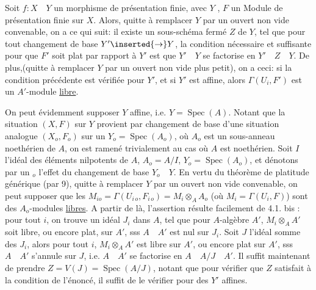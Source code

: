 

 Soit $f:X\quad Y$ un morphisme de présentation finie, avec $Y$ \inserted{$\neq\varnothing$}, $F$ un Module de présentation finie sur $X$. Alors, quitte à remplacer $Y$ par un ouvert non vide convenable, on a ce qui suit: il existe un sous-schéma fermé  $Z$ de $Y$,  tel que pour tout changement de base $Y'\inserted{\to}Y$, la condition nécessaire et suffisante pour que $F'$ soit plat par rapport à $Y'$ est que $Y'\quad Y$ se factorise  en $Y'\quad Z\quad Y$.
De plus,(quitte à remplacer $Y$ par un ouvert non vide plus petit), on a ceci: si la condition précédente est vérifiée pour $Y'$, et si $Y'$ est affine,  alors  $\Gamma(U_i,F')$ est un $A'$-module \uline{libre}.

On peut évidemment supposer $Y$ affine, i.e. $Y=\operatorname{Spec}(A)$. Notant que la situation $(X,F)$ sur $Y$ provient par changement de base d'une situation analogue $(X_o,F_o)$ sur un $Y_o=\operatorname{Spec}(A_o)$, où $A_o$ est un sous-anneau noethérien de $A$, on est ramené trivialement au cas où $A$ est noethérien. Soit $I$ l'idéal des éléments nilpotents de $A$, $A_o=A/I$, $Y_o=\operatorname{Spec}(A_o)$, et dénotons par un ${}_o$ l'effet du changement de base $Y_o\quad Y$. En vertu du théorème de platitude générique (par 9), quitte à remplacer $Y$ par un ouvert non vide convenable, on peut supposer que les $M_{io}=\Gamma(U_{i\,o},F_{i\,o})=M_i\otimes_A A_o$ (où $M_i=\Gamma(U_i,F)$) sont des $A_o$-modules \uline{libres}. A partir de là, l'assertion résulte facilement de 4.1. bis : pour tout $i$, on trouve un idéal $J_i$ dans $A$, tel que pour  $A$-algèbre $A'$, $M_i\otimes_A A'$ soit libre, ou encore plat, sur $A'$, sss $A\quad A'$ est nul sur $J_i$. Soit $J$ l'idéal somme des $J_i$, alors pour tout $i$, $M_i\otimes_A A'$ est libre sur $A'$, ou encore plat sur $A'$, sss $A\quad A'$ s'annule sur $J$, i.e. $A\quad A'$ se factorise en $A\quad A/J\quad A'$. Il suffit maintenant de prendre $Z=V(J)=\operatorname{Spec}(A/J)$, notant que  pour vérifier que $Z$ satisfait à la condition de l'énoncé, il suffit de le vérifier pour des $Y'$ affines. 

